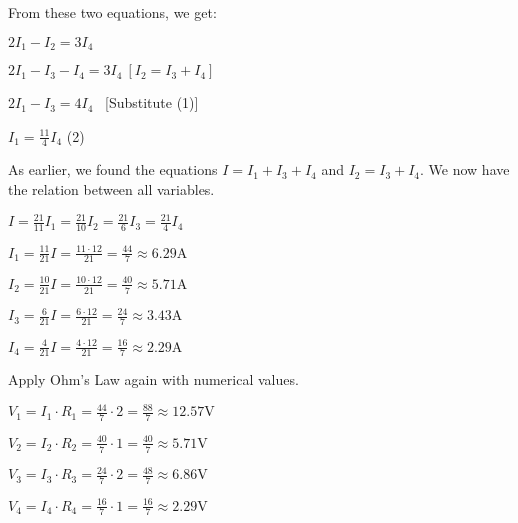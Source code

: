 \documentclass{article}
\begin{document}
\vspace{4mm}

{\Large From these two equations, we get:}

\vspace{4mm}

{\Large $2I_1 - I_2 = 3I_4$}

{\Large $2I_1 - I_3 - I_4 = 3I_4 \ [I_2 = I_3 + I_4]$}

{\Large $2I_1 - I_3 = 4I_4$ \ [Substitute (1)]}

{\Large $\displaystyle I_1 = \frac{11}{4}I_4$ (2)}

\vspace{4mm}

{\Large As earlier, we found the equations $I = I_1 + I_3 + I_4$ and $I_2 = I_3 + I_4$. We now have the relation between all variables.}

\vspace{4mm}

{\Large $\displaystyle I = \frac{21}{11}I_1 = \frac{21}{10}I_2 = \frac{21}{6}I_3 = \frac{21}{4}I_4$}

\vspace{4mm}

{\Large $\displaystyle \boxed{I_1 = \frac{11}{21}I = \frac{11\cdot 12}{21} = \frac{44}{7} \approx 6.29 \text{A}}$}

{\Large $\displaystyle \boxed{I_2 = \frac{10}{21}I = \frac{10\cdot 12}{21} = \frac{40}{7}  \approx 5.71 \text{A}}$}

{\Large $\displaystyle \boxed{I_3 = \frac{6}{21}I = \frac{6\cdot 12}{21} = \frac{24}{7}  \approx 3.43 \text{A}}$}

{\Large $\displaystyle \boxed{I_4 = \frac{4}{21}I = \frac{4\cdot 12}{21} = \frac{16}{7}  \approx 2.29 \text{A}}$}

\vspace{4mm}

{\Large Apply Ohm's Law again with numerical values.}

\vspace{4mm}

{\Large $\displaystyle \boxed{V_1 = I_1\cdot R_1 = \frac{44}{7} \cdot 2 = \frac{88}{7} \approx 12.57 \text{V}}$}

{\Large $\displaystyle \boxed{V_2 = I_2\cdot R_2 = \frac{40}{7} \cdot 1 = \frac{40}{7} \approx 5.71 \text{V}}$}

{\Large $\displaystyle \boxed{V_3 = I_3\cdot R_3 = \frac{24}{7} \cdot 2 = \frac{48}{7} \approx 6.86 \text{V}}$}

{\Large $\displaystyle \boxed{V_4 = I_4\cdot R_4 = \frac{16}{7} \cdot 1 = \frac{16}{7} \approx 2.29 \text{V}}$}
\end{document}
